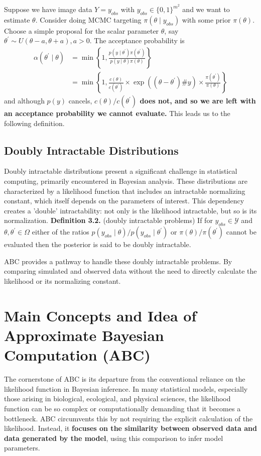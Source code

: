 \documentclass{article}
\begin{document}
Suppose we have image data $Y=y_{o b s}$ with $y_{o b s} \in\{0,1\}^{m^2}$ and we want to estimate $\theta$. Consider doing MCMC targeting $\pi\left(\theta \mid y_{o b s}\right)$ with some prior $\pi(\theta)$. Choose a simple proposal for the scalar parameter $\theta$, say $\theta^{\prime} \sim U(\theta-a, \theta+a), a>0$. The acceptance probability is
$$
\begin{aligned}
\alpha\left(\theta^{\prime} \mid \theta\right) & =\min \left\{1, \frac{p\left(y \mid \theta^{\prime}\right) \pi\left(\theta^{\prime}\right)}{p(y \mid \theta) \pi(\theta)}\right\} \\
& =\min \left\{1, \frac{c(\theta)}{c\left(\theta^{\prime}\right)} \times \exp \left(\left(\theta-\theta^{\prime}\right) \# y\right) \times \frac{\pi\left(\theta^{\prime}\right)}{\pi(\theta)}\right\}
\end{aligned}
$$
and although $p(y)$ cancels,\textbf{ $c(\theta) / c\left(\theta^{\prime}\right)$ does not, and so we are left with an acceptance probability we cannot evaluate.} This leads us to the following definition.


\subsection{Doubly Intractable Distributions}

Doubly intractable distributions present a significant challenge in statistical computing, primarily encountered in Bayesian analysis. These distributions are characterized by a likelihood function that includes an intractable normalizing constant, which itself depends on the parameters of interest. This dependency creates a 'double' intractability: not only is the likelihood intractable, but so is its normalization.
\newline
\textbf{Definition 3.2.} (doubly intractable problems) If for $y_{o b s} \in \mathcal{Y}$ and $\theta, \theta^{\prime} \in \Omega$ either of the ratios $p\left(y_{o b s} \mid \theta\right) / p\left(y_{o b s} \mid \theta^{\prime}\right)$ or $\pi(\theta) / \pi\left(\theta^{\prime}\right)$ cannot be evaluated then the posterior is said to be doubly intractable.

ABC provides a pathway to handle these doubly intractable problems. By comparing simulated and observed data without the need to directly calculate the likelihood or its normalizing constant. 

\section{Main Concepts and Idea of Approximate Bayesian Computation (ABC)}
The cornerstone of ABC is its departure from the conventional reliance on the likelihood function in Bayesian inference. In many statistical models, especially those arising in biological, ecological, and physical sciences, the likelihood function can be so complex or computationally demanding that it becomes a bottleneck. ABC circumvents this by not requiring the explicit calculation of the likelihood. Instead, it \textbf{focuses on the similarity between observed data and data generated by the model}, using this comparison to infer model parameters.
\end{document}
